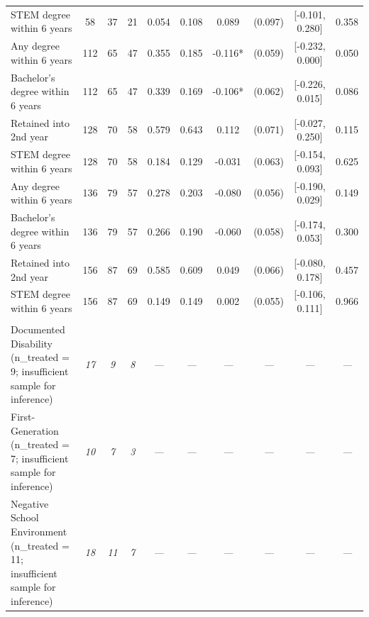 \begin{table}[t]
\begin{tabular*}{\linewidth}{@{\extracolsep{\fill}}l|ccccccccc}
STEM degree within 6 years & 58 & 37 & 21 & 0.054 & 0.108 & 0.089 & (0.097) & [-0.101, 0.280] & 0.358 \\ 
Any degree within 6 years & 112 & 65 & 47 & 0.355 & 0.185 & -0.116* & (0.059) & [-0.232, 0.000] & 0.050 \\ 
Bachelor's degree within 6 years & 112 & 65 & 47 & 0.339 & 0.169 & -0.106* & (0.062) & [-0.226, 0.015] & 0.086 \\ 
Retained into 2nd year & 128 & 70 & 58 & 0.579 & 0.643 & 0.112 & (0.071) & [-0.027, 0.250] & 0.115 \\ 
STEM degree within 6 years & 128 & 70 & 58 & 0.184 & 0.129 & -0.031 & (0.063) & [-0.154, 0.093] & 0.625 \\ 
Any degree within 6 years & 136 & 79 & 57 & 0.278 & 0.203 & -0.080 & (0.056) & [-0.190, 0.029] & 0.149 \\ 
Bachelor's degree within 6 years & 136 & 79 & 57 & 0.266 & 0.190 & -0.060 & (0.058) & [-0.174, 0.053] & 0.300 \\ 
Retained into 2nd year & 156 & 87 & 69 & 0.585 & 0.609 & 0.049 & (0.066) & [-0.080, 0.178] & 0.457 \\ 
STEM degree within 6 years & 156 & 87 & 69 & 0.149 & 0.149 & 0.002 & (0.055) & [-0.106, 0.111] & 0.966 \\ 
\midrule\addlinespace[2.5pt]
\multicolumn{10}{l}{{\itshape \textbf{Suppressed Subgroups} \emph{(n \textless{} 20 treated --- insufficient for inference)}}} \\[2.5pt] 
\midrule\addlinespace[2.5pt]
Documented Disability (n\_treated = 9; insufficient sample for inference) & {\itshape \textcolor[HTML]{7F7F7F}{17}} & {\itshape \textcolor[HTML]{7F7F7F}{9}} & {\itshape \textcolor[HTML]{7F7F7F}{8}} & {\itshape \textcolor[HTML]{7F7F7F}{—}} & {\itshape \textcolor[HTML]{7F7F7F}{—}} & {\itshape \textcolor[HTML]{7F7F7F}{—}} & {\itshape \textcolor[HTML]{7F7F7F}{—}} & {\itshape \textcolor[HTML]{7F7F7F}{—}} & {\itshape \textcolor[HTML]{7F7F7F}{—}} \\ 
First-Generation (n\_treated = 7; insufficient sample for inference) & {\itshape \textcolor[HTML]{7F7F7F}{10}} & {\itshape \textcolor[HTML]{7F7F7F}{7}} & {\itshape \textcolor[HTML]{7F7F7F}{3}} & {\itshape \textcolor[HTML]{7F7F7F}{—}} & {\itshape \textcolor[HTML]{7F7F7F}{—}} & {\itshape \textcolor[HTML]{7F7F7F}{—}} & {\itshape \textcolor[HTML]{7F7F7F}{—}} & {\itshape \textcolor[HTML]{7F7F7F}{—}} & {\itshape \textcolor[HTML]{7F7F7F}{—}} \\ 
Negative School Environment (n\_treated = 11; insufficient sample for inference) & {\itshape \textcolor[HTML]{7F7F7F}{18}} & {\itshape \textcolor[HTML]{7F7F7F}{11}} & {\itshape \textcolor[HTML]{7F7F7F}{7}} & {\itshape \textcolor[HTML]{7F7F7F}{—}} & {\itshape \textcolor[HTML]{7F7F7F}{—}} & {\itshape \textcolor[HTML]{7F7F7F}{—}} & {\itshape \textcolor[HTML]{7F7F7F}{—}} & {\itshape \textcolor[HTML]{7F7F7F}{—}} & {\itshape \textcolor[HTML]{7F7F7F}{—}} \\ 

\end{tabular*}
\end{table}
